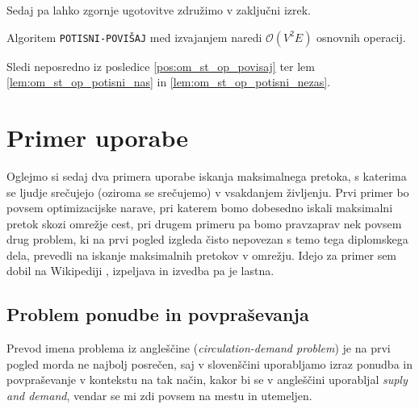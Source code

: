 \documentclass[mat1]{fmfdelo}
\begin{document}
Sedaj pa lahko zgornje ugotovitve združimo v zaključni izrek.

\begin{izrek}
Algoritem \texttt{POTISNI-POVIŠAJ} med izvajanjem naredi $\mathcal{O}(V^2E)$ osnovnih operacij.
\end{izrek}

\begin{dokaz}
Sledi neposredno iz posledice \ref{pos:om_st_op_povisaj} ter lem \ref{lem:om_st_op_potisni_nas} in \ref{lem:om_st_op_potisni_nezas}.
\end{dokaz}


\section{Primer uporabe}


Oglejmo si sedaj dva primera uporabe iskanja maksimalnega pretoka, s katerima se ljudje srečujejo (oziroma se srečujemo) v vsakdanjem življenju. Prvi primer bo povsem
optimizacijske narave, pri katerem bomo dobesedno iskali maksimalni pretok skozi omrežje cest, pri drugem primeru
pa bomo pravzaprav nek povsem drug problem, ki na prvi pogled izgleda čisto nepovezan s temo tega diplomskega
dela, prevedli na iskanje maksimalnih pretokov v omrežju. Idejo za primer sem dobil na Wikipediji \cite{wiki}, izpeljava in izvedba pa je lastna.


\subsection{Problem ponudbe in povpraševanja}

Prevod imena problema iz angleščine (\textit{circulation-demand problem}) je na prvi pogled morda ne najbolj posrečen,
saj v slovenščini uporabljamo izraz ponudba in povpraševanje v kontekstu na tak način, kakor bi se v angleščini uporabljal
\textit{suply and demand}, vendar se mi zdi povsem na mestu in utemeljen.
\end{document}
